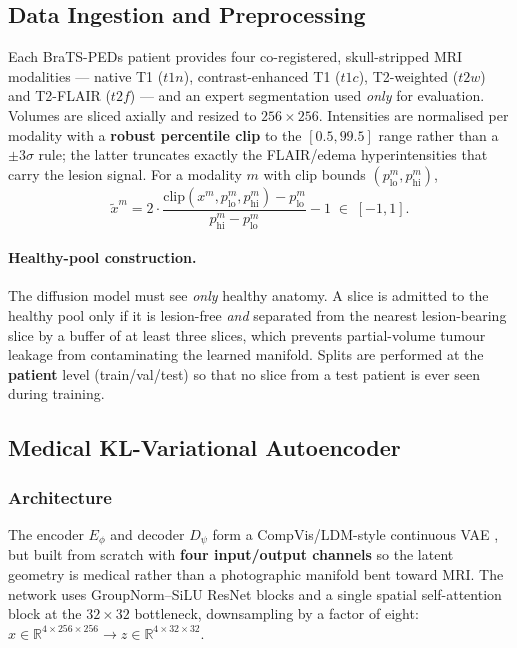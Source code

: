 \documentclass[12pt, a4paper]{article}
\begin{document}
\subsection{Data Ingestion and Preprocessing}
Each BraTS-PEDs patient provides four co-registered, skull-stripped MRI modalities — native T1 ($t1n$), contrast-enhanced T1 ($t1c$), T2-weighted ($t2w$) and T2-FLAIR ($t2f$) — and an expert segmentation used \emph{only} for evaluation. Volumes are sliced axially and resized to $256\times256$. Intensities are normalised per modality with a \textbf{robust percentile clip} to the $[0.5, 99.5]$ range rather than a $\pm 3\sigma$ rule; the latter truncates exactly the FLAIR/edema hyperintensities that carry the lesion signal. For a modality $m$ with clip bounds $(p_{\text{lo}}^m, p_{\text{hi}}^m)$,
\begin{equation}
    \tilde{x}^m = 2\cdot\frac{\mathrm{clip}(x^m, p_{\text{lo}}^m, p_{\text{hi}}^m) - p_{\text{lo}}^m}{p_{\text{hi}}^m - p_{\text{lo}}^m} - 1 \;\in\; [-1, 1].
\end{equation}

\paragraph{Healthy-pool construction.} The diffusion model must see \emph{only} healthy anatomy. A slice is admitted to the healthy pool only if it is lesion-free \emph{and} separated from the nearest lesion-bearing slice by a buffer of at least three slices, which prevents partial-volume tumour leakage from contaminating the learned manifold. Splits are performed at the \textbf{patient} level (train/val/test) so that no slice from a test patient is ever seen during training.

\subsection{Medical KL-Variational Autoencoder}
\subsubsection{Architecture}
The encoder $E_\phi$ and decoder $D_\psi$ form a CompVis/LDM-style continuous VAE \cite{rombach2022, kingma2014}, but built from scratch with \textbf{four input/output channels} so the latent geometry is medical rather than a photographic manifold bent toward MRI. The network uses GroupNorm--SiLU ResNet blocks and a single spatial self-attention block at the $32\times32$ bottleneck, downsampling by a factor of eight: $x\in\mathbb{R}^{4\times256\times256} \rightarrow z\in\mathbb{R}^{4\times32\times32}$.
\end{document}
